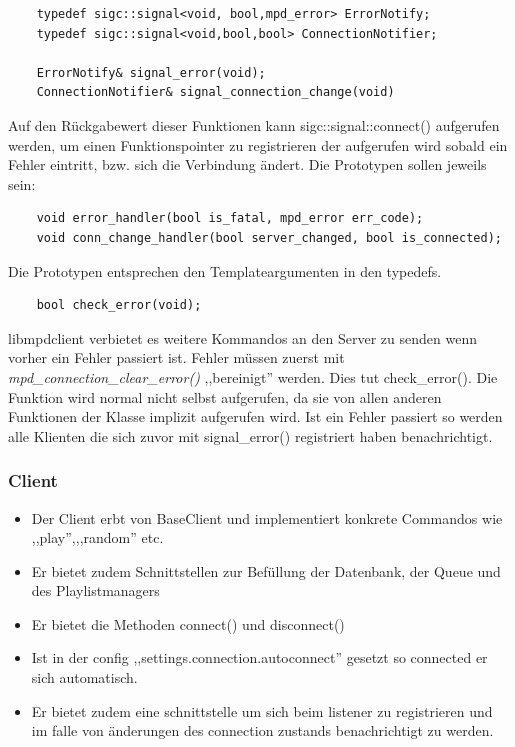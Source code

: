 \begin{verbatim}
    typedef sigc::signal<void, bool,mpd_error> ErrorNotify;
    typedef sigc::signal<void,bool,bool> ConnectionNotifier;
    
    ErrorNotify& signal_error(void);
    ConnectionNotifier& signal_connection_change(void)
\end{verbatim}
Auf den Rückgabewert dieser Funktionen kann sigc::signal::connect() aufgerufen werden, 
um einen Funktionspointer zu registrieren der aufgerufen wird sobald ein Fehler eintritt,
bzw. sich die Verbindung ändert. Die Prototypen sollen jeweils sein:
\begin{verbatim}
    void error_handler(bool is_fatal, mpd_error err_code);
    void conn_change_handler(bool server_changed, bool is_connected); 
\end{verbatim} 
Die Prototypen entsprechen den Templateargumenten in den typedefs.

\begin{verbatim}
    bool check_error(void);
\end{verbatim}
libmpdclient verbietet es weitere Kommandos an den Server zu senden wenn vorher ein Fehler passiert ist.
Fehler müssen zuerst mit \emph{mpd\_connection\_clear\_error()} ,,bereinigt'' werden. 
Dies tut check\_error(). Die Funktion wird normal nicht selbst aufgerufen, da sie von allen anderen Funktionen der Klasse
implizit aufgerufen wird. Ist ein Fehler passiert so werden alle Klienten die sich zuvor
mit signal\_error() registriert haben benachrichtigt. 


\subsubsection{Client}
\begin{itemize}
    \item Der Client erbt von BaseClient und implementiert konkrete Commandos wie ,,play'',,,random'' etc.
    \item Er bietet zudem Schnittstellen zur Befüllung der Datenbank, der Queue und des Playlistmanagers
    \item Er bietet die Methoden connect() und disconnect() 
    \item Ist in der config ,,settings.connection.autoconnect'' gesetzt so connected er sich automatisch.
    \item Er bietet zudem eine schnittstelle um sich beim listener zu registrieren und im falle von 
        änderungen des connection zustands benachrichtigt zu werden.
\end{itemize}

